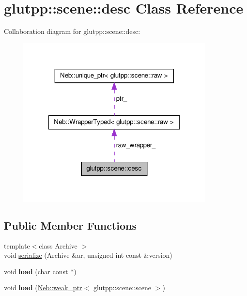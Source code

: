 \hypertarget{classglutpp_1_1scene_1_1desc}{\section{glutpp\-:\-:scene\-:\-:desc \-Class \-Reference}
\label{classglutpp_1_1scene_1_1desc}
}


\-Collaboration diagram for glutpp\-:\-:scene\-:\-:desc\-:\nopagebreak
\begin{figure}[H]
\begin{center}
\leavevmode
\includegraphics[width=282pt]{classglutpp_1_1scene_1_1desc__coll__graph}
\end{center}
\end{figure}
\subsection*{\-Public \-Member \-Functions}
\begin{DoxyCompactItemize}
\item 
{\footnotesize template$<$class Archive $>$ }\\void \hyperlink{classglutpp_1_1scene_1_1desc_a90063754f769b68b932ee7a54c252d69}{serialize} (\-Archive \&ar, unsigned int const \&version)
\item 
\hypertarget{classglutpp_1_1scene_1_1desc_a7f68fd9fba4752e874f12ed7a4deaeaf}{void {\bfseries load} (char const $\ast$)}\label{classglutpp_1_1scene_1_1desc_a7f68fd9fba4752e874f12ed7a4deaeaf}

\item 
\hypertarget{classglutpp_1_1scene_1_1desc_a4c546a2b725400e983f1e57c6e1bb5d9}{void {\bfseries load} (\hyperlink{classNeb_1_1weak__ptr}{\-Neb\-::weak\-\_\-ptr}$<$ glutpp\-::scene\-::scene $>$)}\label{classglutpp_1_1scene_1_1desc_a4c546a2b725400e983f1e57c6e1bb5d9}

\end{DoxyCompactItemize}
